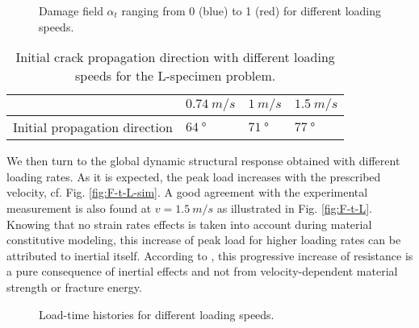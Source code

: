 \begin{figure}[htbp]
\centering
\caption{Damage field $\alpha_t$ ranging from 0 (blue) to 1 (red) for different loading speeds.} \label{fig:alpha_L}
\end{figure}

\begin{table}[htbp]
\centering
\caption{Initial crack propagation direction with different loading speeds for the L-specimen problem.} \label{tab:initial_angle}
\begin{tabular}{llll} \toprule
& $\SI{0.74}{m/s}$ & $\SI{1}{m/s}$ & $\SI{1.5}{m/s}$ \\ \midrule
Initial propagation direction & $\SI{64}{\degree}$ & $\SI{71}{\degree}$ & $\SI{77}{\degree}$ \\ \bottomrule
\end{tabular}
\end{table}

We then turn to the global dynamic structural response obtained with different loading rates. As it is expected, the peak load increases with the prescribed velocity, cf. Fig. \ref{fig:F-t-L-sim}. A good agreement with the experimental measurement is also found at $v=\SI{1.5}{m/s}$ as illustrated in Fig. \ref{fig:F-t-L}. Knowing that no strain rates effects is taken into account during material constitutive modeling, this increase of peak load for higher loading rates can be attributed to inertial itself. According to \cite{OzboltBedeSharmaMayer:2015}, this progressive increase of resistance is a pure consequence of inertial effects and not from velocity-dependent material strength or fracture energy.
\begin{figure}[htbp]
\centering
\caption{Load-time histories for different loading speeds.}
\end{figure}


